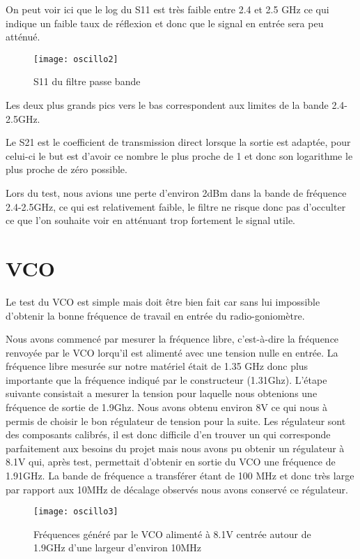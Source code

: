 On peut voir ici que le log du S11 est très faible entre 2.4 et 2.5 GHz ce qui indique un faible taux de réflexion et donc que le signal en entrée sera peu atténué.

\begin{figure}[h]
  \centering
  \texttt{[image: oscillo2]}
  \caption{S11 du filtre passe bande}
  \label{fig:filtre}
\end{figure}


Les deux plus grands pics vers le bas correspondent aux limites de la bande 2.4-2.5GHz.

Le S21 est le coefficient de transmission direct lorsque la sortie est adaptée, pour celui-ci le but est d’avoir ce nombre le plus proche de 1 et donc son logarithme le plus proche de zéro possible.

Lors du test, nous avions une perte d’environ 2dBm dans la bande de fréquence 2.4-2.5GHz, ce qui est relativement faible, le filtre ne risque donc pas d’occulter ce que l’on souhaite voir en atténuant trop fortement le signal utile.
\newpage
\section{VCO}



Le test du VCO est simple mais doit être bien fait car sans lui impossible d’obtenir la bonne fréquence de travail en entrée du radio-goniomètre.

Nous avons commencé par mesurer la fréquence libre, c’est-à-dire la fréquence renvoyée par le VCO lorqu'il est alimenté avec une tension nulle en entrée. La fréquence libre mesurée sur notre matériel était de 1.35 GHz donc plus importante que la fréquence indiqué par le constructeur (1.31Ghz). L'étape suivante consistait a mesurer la tension pour laquelle nous obtenions une fréquence de sortie de 1.9Ghz. Nous avons obtenu environ 8V ce qui nous à permis de choisir le bon régulateur de tension pour la suite.
 Les régulateur sont des composants calibrés, il est donc difficile d’en trouver un qui corresponde parfaitement aux besoins du projet mais nous avons pu obtenir un régulateur à 8.1V qui, après test, permettait d'obtenir en sortie du VCO une fréquence de 1.91GHz. La bande de fréquence a transférer étant de 100 MHz et donc très large par rapport aux 10MHz de décalage observés nous avons conservé ce régulateur.


\begin{figure}[h]
  \centering
  \texttt{[image: oscillo3]}
  \caption{Fréquences généré par le VCO alimenté à 8.1V centrée autour de 1.9GHz d’une largeur d’environ 10MHz}
  \label{fig:freq}
\end{figure}
\newpage
